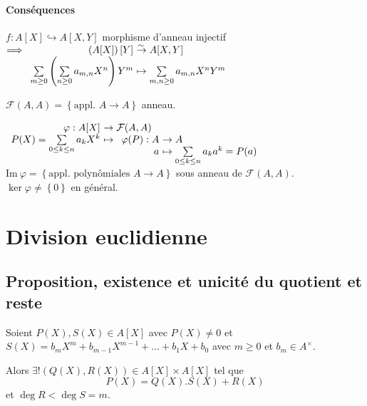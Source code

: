 \documentclass[reqno,a4paper,10pt]{report}
\makeatletter
\newcommand{\set}[1]{\left\lbrace #1 \right\rbrace} %
\newcommand{\im}{\mathrm{Im}\:} %
\newcommand{\soo}{\Longrightarrow}
\newcommand{\inj}{\hookrightarrow}
\newcommand{\bij}{\overset{\!\sim}{\to}} %
\let\oldenumerate=\enumerate%
\renewenvironment{enumerate}{%
    \oldenumerate%
  }{%
    \@noparlisttrue%
    \endlist%
  }%
\makeatother
\begin{document}
\paragraph{Conséquences}
\begin{enumerate}
  \item $f:A[X] \inj A[X,Y]$ morphisme d'anneau injectif\\
    $\soo \begin{array}[t]{r@{\ }l}
      \left( A[X] \right)[Y] &\bij A[X,Y]\\
      \sum\limits_{m\geq 0} \left( \sum\limits_{n\geq 0} a_{m,n} X^n \right)
      Y^m &\mapsto \sum\limits_{m,n \geq 0} a_{m,n} X^n Y^m
    \end{array}$
  \item $\mathcal{F}(A,A)=\set{\text{appl. } A \to A}$ anneau.

    $\begin{array}[t]{r@{\ }l}
      \varphi : A[X] &\to \mathcal{F}(A,A)\\
      P(X)=\sum\limits_{0\leq k \leq n} a_k X^k &\mapsto
      \begin{array}[t]{r@{\ }l}
        \varphi(P) : A &\to A\\
        a &\mapsto \sum\limits_{0\leq k \leq n} a_k a^k = P(a)
      \end{array}
    \end{array}$\\
    $\im \varphi = \set{\text{appl. polynômiales } A \to A}$ sous anneau de
    $\mathcal F(A,A)$.\\
    $\ker \varphi \neq \set{0}$ en général.
\end{enumerate}

\section{Division euclidienne}
\subsection{Proposition, existence et unicité du quotient et reste}
Soient $P(X), S(X) \in A[X]$ avec $P(X) \neq 0$ et $S(X)=b_m X^m +
b_{m-1} X^{m-1} + \dots + b_1 X + b_0$ avec $m\geq 0$ et $b_m \in A^\times$.

Alors $\exists! (Q(X), R(X)) \in A[X] \times A[X]$ tel que
\[P(X) = Q(X) . S(X) + R(X)\]
et $\deg R < \deg S = m$.

\begin{comment}
  Preuve 07/10/09 p2 verso
\end{comment}
\end{document}
